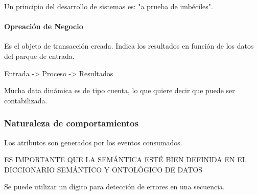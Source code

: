 Un principio del desarrollo de sistemas es: "a prueba de imbéciles". 


\paragraph*{Opreación de Negocio} Es el objeto de transacción creada. Indica los resultados en función de los datos del parque de entrada.

Entrada -> Proceso -> Resultados

Mucha data dinámica es de tipo cuenta, lo que quiere decir que puede ser contabilizada. 



\subsubsection*{Naturaleza de comportamientos} 

Los atributos son generados por los eventos consumados. 

ES IMPORTANTE QUE LA SEMÁNTICA ESTÉ BIEN DEFINIDA EN EL DICCIONARIO SEMÁNTICO Y ONTOLÓGICO DE DATOS


Se puede utilizar un dígito para detección de errores en una secuencia. 